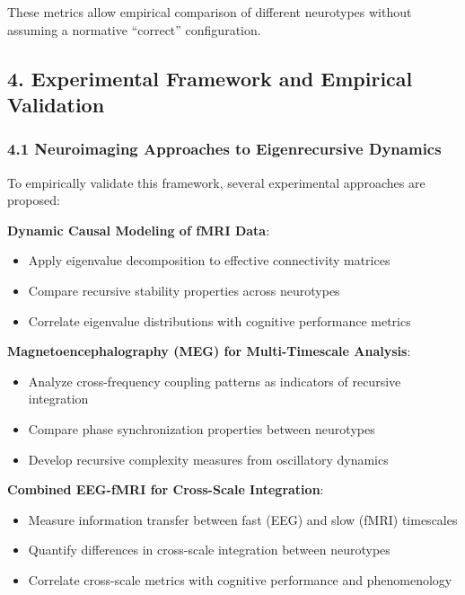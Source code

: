 \documentclass[
]{article}
\providecommand{\tightlist}{%
  \setlength{\itemsep}{0pt}\setlength{\parskip}{0pt}}
\begin{document}
These metrics allow empirical comparison of different neurotypes without
assuming a normative ``correct'' configuration.

\subsection{4. Experimental Framework and Empirical
Validation}\label{experimental-framework-and-empirical-validation}

\subsubsection{4.1 Neuroimaging Approaches to Eigenrecursive
Dynamics}\label{neuroimaging-approaches-to-eigenrecursive-dynamics}

To empirically validate this framework, several experimental approaches
are proposed:

\textbf{Dynamic Causal Modeling of fMRI Data}:

\begin{itemize}
\tightlist
\item
  Apply eigenvalue decomposition to effective connectivity matrices
\item
  Compare recursive stability properties across neurotypes
\item
  Correlate eigenvalue distributions with cognitive performance metrics
\end{itemize}

\textbf{Magnetoencephalography (MEG) for Multi-Timescale Analysis}:

\begin{itemize}
\tightlist
\item
  Analyze cross-frequency coupling patterns as indicators of recursive
  integration
\item
  Compare phase synchronization properties between neurotypes
\item
  Develop recursive complexity measures from oscillatory dynamics
\end{itemize}

\textbf{Combined EEG-fMRI for Cross-Scale Integration}:

\begin{itemize}
\tightlist
\item
  Measure information transfer between fast (EEG) and slow (fMRI)
  timescales
\item
  Quantify differences in cross-scale integration between neurotypes
\item
  Correlate cross-scale metrics with cognitive performance and
  phenomenology
\end{itemize}
\end{document}
